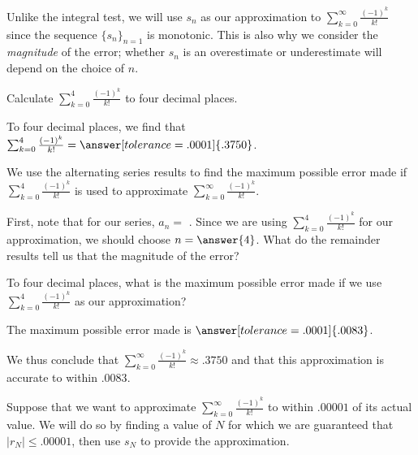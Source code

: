 \documentclass{ximera}
\begin{document}
\begin{exercise}
\begin{exercise}
Unlike the integral test, we will use $s_n$ as our approximation to $\sum_{k=0}^{\infty} \frac{(-1)^k}{k!}$ since the sequence $\{s_n\}_{n=1}$ is  monotonic.  This is also why we consider the \emph{magnitude} of the error; whether $s_n$ is an overestimate or underestimate will depend on the choice of $n$. 

\begin{exercise}
Calculate $\sum_{k=0}^{4} \frac{(-1)^k}{k!}$ to four decimal places.  

To four decimal places, we find that $\sum_{k=0}^{4} \frac{(-1)^k}{k!} = \answer[tolerance=.0001]{.3750}$.  

We use the alternating series results to find the maximum possible error made if $\sum_{k=0}^{4} \frac{(-1)^k}{k!}$ is used to approximate $\sum_{k=0}^{\infty} \frac{(-1)^k}{k!}$. 

First, note that for our series, $a_n =$ .  Since we are using $\sum_{k=0}^{4} \frac{(-1)^k}{k!}$ for our approximation, we should choose $n=\answer{4}$.  What do the remainder results tell us that the magnitude of the error?

\begin{multipleChoice}
\end{multipleChoice}

To four decimal places, what is the maximum possible error made if we use $\sum_{k=0}^{4} \frac{(-1)^k}{k!}$ as our approximation?

The maximum possible error made is $\answer[tolerance=.0001]{.0083}$.

\begin{feedback}
We thus conclude that $\sum_{k=0}^{\infty} \frac{(-1)^k}{k!} \approx .3750$ and that this approximation is accurate to within $.0083$.
\end{feedback}

\begin{exercise}
Suppose that we want to approximate $\sum_{k=0}^{\infty} \frac{(-1)^k}{k!}$ to within $.00001$ of its actual value.  We will do so by finding a value of $N$ for which we are guaranteed that $\big|r_N\big| \leq .00001$, then use $s_N$ to provide the approximation.


\end{exercise}
\end{exercise}
\end{exercise}
\end{exercise}
\end{document}
